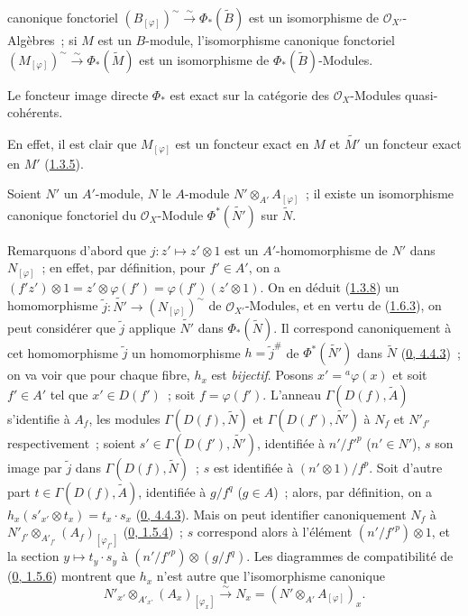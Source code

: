 canonique fonctoriel
$(B_{[\varphi]})^{\sim}\xrightarrow{\sim}\Phi_*(\widetilde{B})$ est un
isomorphisme de $\mathscr{O}_{X'}$-Algèbres~; si $M$ est un $B$-module,
l'isomorphisme canonique fonctoriel
$(M_{[\varphi]})^{\sim}\xrightarrow{\sim}\Phi_*(\widetilde{M})$ est un
isomorphisme de $\Phi_*(\widetilde{B})$-Modules.

\begin{corollary}[1.6.4]
\label{I.1.6.4-fr}
Le foncteur image directe $\Phi_*$ est exact sur la catégorie des
$\mathscr{O}_X$-Modules quasi-cohérents.
\end{corollary}

En effet, il est clair que $M_{[\varphi]}$ est un foncteur exact en $M$ et
$\widetilde{M'}$ un foncteur exact en $M'$ (\hyperref[I.1.3.5-fr]{1.3.5}).

\begin{proposition}[1.6.5]
\label{I.1.6.5-fr}
Soient $N'$ un $A'$-module, $N$ le $A$-module
$N'\otimes_{A'}A_{[\varphi]}$~; il existe un isomorphisme canonique
fonctoriel du $\mathscr{O}_X$-Module $\Phi^*(\widetilde{N'})$ sur
$\widetilde{N}$.
\end{proposition}

Remarquons d'abord que $j:z'\mapsto z'\otimes 1$ est un
$A'$-homomorphisme de $N'$ dans $N_{[\varphi]}$~; en effet, par définition,
pour $f'\in A'$, on a
$(f'z')\otimes 1=z'\otimes\varphi(f')=\varphi(f')(z'\otimes 1)$. On en
déduit (\hyperref[I.1.3.8-fr]{1.3.8}) un homomorphisme
$\widetilde{j}:\widetilde{N'}\to(N_{[\varphi]})^{\sim}$ de
$\mathscr{O}_{X'}$-Modules, et en vertu de
(\hyperref[I.1.6.3-fr]{1.6.3}), on peut considérer que $\widetilde{j}$
applique $\widetilde{N'}$ dans $\Phi_*(\widetilde{N})$. Il correspond
canoniquement à cet homomorphisme $\widetilde{j}$ un homomorphisme
$h=\widetilde{j}^{\#}$ de $\Phi^*(\widetilde{N'})$ dans $\widetilde{N}$
(\hyperref[0.4.4.3-fr]{0, 4.4.3})~; on va voir que pour chaque fibre,
$h_x$ est \emph{bijectif}. Posons $x'={}^a\varphi(x)$ et soit $f'\in A'$
tel que $x'\in D(f')$~; soit $f=\varphi(f')$. L'anneau
$\Gamma(D(f),\widetilde{A})$ s'identifie à $A_f$, les modules
$\Gamma(D(f),\widetilde{N})$ et $\Gamma(D(f'),\widetilde{N'})$ à $N_f$ et
$N'_{f'}$ respectivement~; soient
$s'\in\Gamma(D(f'),\widetilde{N'})$, identifiée à $n'/{f'}^p$ ($n'\in N'$),
$s$ son image par $\widetilde{j}$ dans $\Gamma(D(f),\widetilde{N})$~; $s$
est identifiée à $(n'\otimes 1)/f^p$. Soit d'autre part
$t\in\Gamma(D(f),\widetilde{A})$, identifiée à $g/f^q$ ($g\in A$)~; alors,
par définition, on a
$h_x(s'_{x'}\otimes t_x)=t_x\cdot s_x$
(\hyperref[0.4.4.3-fr]{0, 4.4.3}). Mais on peut identifier canoniquement
$N_f$ à
$N'_{f'}\otimes_{A'_{f'}}(A_f)_{[\varphi_{f'}]}$
(\hyperref[0.1.5.4-fr]{0, 1.5.4})~; $s$ correspond alors à l'élément
$(n'/{f'}^p)\otimes 1$, et la section $y\mapsto t_y\cdot s_y$ à
$(n'/{f'}^p)\otimes(g/f^q)$. Les diagrammes de compatibilité de
(\hyperref[0.1.5.6-fr]{0, 1.5.6}) montrent que $h_x$ n'est autre que
l'isomorphisme canonique
\[
  \label{I.1.6.5.1-fr}
  N'_{x'}\otimes_{A'_{x'}}(A_x)_{[\varphi_x]}
  \xrightarrow{\sim}N_x=(N'\otimes_{A'}A_{[\varphi]})_x.
  \tag{1.6.5.1}
\]

